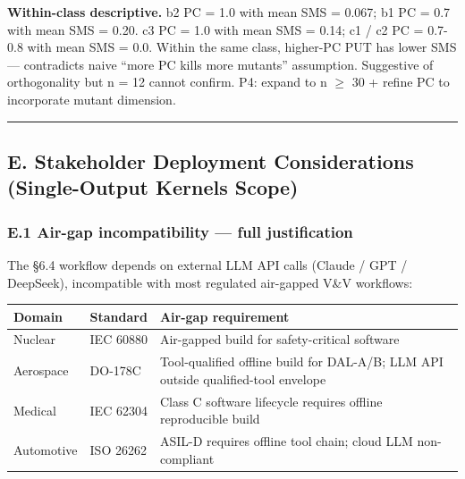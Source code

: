 \documentclass[review,12pt,authoryear]{elsarticle}
\newcounter{none}                   %
\begin{document}
\textbf{Within-class descriptive.} b2 PC = 1.0 with mean SMS = 0.067; b1
PC = 0.7 with mean SMS = 0.20. c3 PC = 1.0 with mean SMS = 0.14; c1 / c2
PC = 0.7-0.8 with mean SMS = 0.0. Within the same class, higher-PC PUT
has lower SMS --- contradicts naive ``more PC kills more mutants''
assumption. Suggestive of orthogonality but n = 12 cannot confirm. P4:
expand to n $\geq$ 30 + refine PC to incorporate mutant dimension.

\begin{center}\rule{0.5\linewidth}{0.5pt}\end{center}

\subsection{E. Stakeholder Deployment Considerations (Single-Output
Kernels
Scope)}\label{e.-stakeholder-deployment-considerations-single-output-kernels-scope}

\subsubsection{E.1 Air-gap incompatibility --- full
justification}\label{e.1-air-gap-incompatibility-full-justification}

The §6.4 workflow depends on external LLM API calls (Claude / GPT /
DeepSeek), incompatible with most regulated air-gapped V\&V workflows:

{\def\LTcaptype{none} %
\begin{longtable}[]{@{}
  >{\raggedright\arraybackslash}p{}
  >{\raggedright\arraybackslash}p{}
  >{\raggedright\arraybackslash}p{}@{}}
\toprule\noalign{}
\begin{minipage}[b]{\linewidth}\raggedright
Domain
\end{minipage} & \begin{minipage}[b]{\linewidth}\raggedright
Standard
\end{minipage} & \begin{minipage}[b]{\linewidth}\raggedright
Air-gap requirement
\end{minipage} \\
\midrule\noalign{}
\endhead
\bottomrule\noalign{}
\endlastfoot
Nuclear & IEC 60880 & Air-gapped build for safety-critical software \\
Aerospace & DO-178C & Tool-qualified offline build for DAL-A/B; LLM API
outside qualified-tool envelope \\
Medical & IEC 62304 & Class C software lifecycle requires offline
reproducible build \\
Automotive & ISO 26262 & ASIL-D requires offline tool chain; cloud LLM
non-compliant \\
\end{longtable}
}
\end{document}
